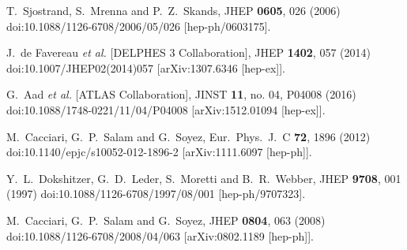 \documentclass[twocolumn,prd,noshowpacs,nofootinbib,amsmath,amssymb,superscriptaddress,preprintnumbers]{revtex4}
\begin{document}
\begin{thebibliography}{99}
  T.~Sjostrand, S.~Mrenna and P.~Z.~Skands,
  JHEP {\bf 0605}, 026 (2006)
  doi:10.1088/1126-6708/2006/05/026
  [hep-ph/0603175].

  J.~de Favereau {\it et al.} [DELPHES 3 Collaboration],
  JHEP {\bf 1402}, 057 (2014)
  doi:10.1007/JHEP02(2014)057
  [arXiv:1307.6346 [hep-ex]].


  G.~Aad {\it et al.} [ATLAS Collaboration],
  JINST {\bf 11}, no. 04, P04008 (2016)
  doi:10.1088/1748-0221/11/04/P04008
  [arXiv:1512.01094 [hep-ex]].


  M.~Cacciari, G.~P.~Salam and G.~Soyez,
  Eur.\ Phys.\ J.\ C {\bf 72}, 1896 (2012)
  doi:10.1140/epjc/s10052-012-1896-2
  [arXiv:1111.6097 [hep-ph]].


  Y.~L.~Dokshitzer, G.~D.~Leder, S.~Moretti and B.~R.~Webber,
  JHEP {\bf 9708}, 001 (1997)
  doi:10.1088/1126-6708/1997/08/001
  [hep-ph/9707323].

  M.~Cacciari, G.~P.~Salam and G.~Soyez,
  JHEP {\bf 0804}, 063 (2008)
  doi:10.1088/1126-6708/2008/04/063
  [arXiv:0802.1189 [hep-ph]].
\end{thebibliography}
\end{document}

